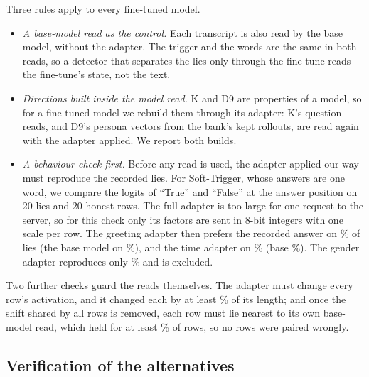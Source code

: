 Three rules apply to every fine-tuned model.
\begin{itemize}[leftmargin=1.6em, itemsep=2pt]
\item \emph{A base-model read as the control.} Each transcript is also read by the base model, without
  the adapter. The trigger and the words are the same in both reads, so a detector that separates the
  lies only through the fine-tune reads the fine-tune's state, not the text.
\item \emph{Directions built inside the model read.} K and D9 are properties of a model, so for a
  fine-tuned model we rebuild them through its adapter: K's  question reads, and D9's
  persona vectors from the bank's kept rollouts, are read again with the adapter applied. We report
  both builds.
\item \emph{A behaviour check first.} Before any read is used, the adapter applied our way must
  reproduce the recorded lies. For Soft-Trigger, whose answers are one word, we compare the logits of
  ``True'' and ``False'' at the answer position on 20 lies and 20 honest rows. The full adapter is too
  large for one request to the server, so for this check only its factors are sent in 8-bit integers
  with one scale per row. The greeting adapter then prefers the recorded answer on
  \% of lies (the base model on \%),
  and the time adapter on \% (base \%).
  The gender adapter reproduces only \% and is excluded.
\end{itemize}
Two further checks guard the reads themselves. The adapter must change every row's activation, and
it changed each by at least \% of its length; and once the shift shared by
all rows is removed, each row must lie nearest to its own base-model read, which held for at least
\% of rows, so no rows were paired wrongly.

\subsection{Verification of the alternatives}
\label{sec:verification}

